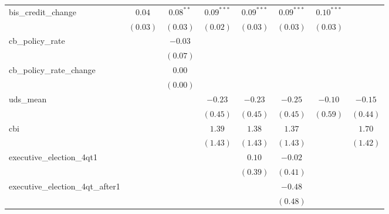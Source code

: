 \begin{tabular}{l c c c c c c c }
bis\_credit\_change              & $0.04$       & $0.08^{**}$   & $0.09^{***}$  & $0.09^{***}$  & $0.09^{***}$  & $0.10^{***}$ &               \\
                                 & $(0.03)$     & $(0.03)$      & $(0.02)$      & $(0.03)$      & $(0.03)$      & $(0.03)$     &               \\
cb\_policy\_rate                 &              & $-0.03$       &               &               &               &              &               \\
                                 &              & $(0.07)$      &               &               &               &              &               \\
cb\_policy\_rate\_change         &              & $0.00$        &               &               &               &              &               \\
                                 &              & $(0.00)$      &               &               &               &              &               \\
uds\_mean                        &              &               & $-0.23$       & $-0.23$       & $-0.25$       & $-0.10$      & $-0.15$       \\
                                 &              &               & $(0.45)$      & $(0.45)$      & $(0.45)$      & $(0.59)$     & $(0.44)$      \\
cbi                              &              &               & $1.39$        & $1.38$        & $1.37$        &              & $1.70$        \\
                                 &              &               & $(1.43)$      & $(1.43)$      & $(1.43)$      &              & $(1.42)$      \\
executive\_election\_4qt1        &              &               &               & $0.10$        & $-0.02$       &              &               \\
                                 &              &               &               & $(0.39)$      & $(0.41)$      &              &               \\
executive\_election\_4qt\_after1 &              &               &               &               & $-0.48$       &              &               \\
                                 &              &               &               &               & $(0.48)$      &              &               \\

\end{tabular}
